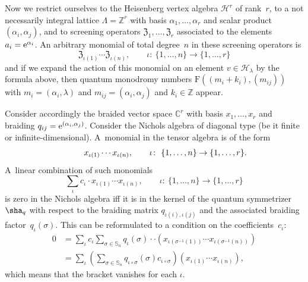 \documentclass[pdftex]{sigma}%
\numberwithin{equation}{section}
\newcommand{\Z}{\mathbb{Z}}
\newcommand{\C}{\mathbb{C}}
\renewcommand{\S}{\mathbb{S}}
\newcommand{\zem}{\mathfrak{Z}}
\newcommand{\Fp}{\mathrm{F}}
\begin{document}
Now we restrict ourselves to the Heisenberg vertex algebra $\mathcal{H}^r$ of rank~$r$, to a not necessarily integral lattice $\Lambda=\Z^r$ with basis $\alpha_1,\dots, \alpha_r$ and scalar product $(\alpha_i,\alpha_j)$, and to screening operators $\zem_1,\dots,\zem_r$ associated to the elements $a_i={\rm e}^{\alpha_i}$.
An arbitrary monomial of total degree~$n$ in these screening operators is
\[ \zem_{\iota(1)}\cdots \zem_{\iota(n)},\qquad \iota\colon \ \{1,\dots,n\}\to \{1,\dots,r\}\]
and if we expand the action of this monomial on an element $v\in \mathcal{H}_\lambda$ by the formula above, then quantum monodromy numbers $\Fp((m_i+k_i),(m_{ij}))$ with $m_i=(\alpha_i,\lambda)$ and $m_{ij}=(\alpha_i,\alpha_j)$ and $k_i\in \Z$ appear.

Consider accordingly the braided vector space $\C^r$ with basis $x_1,\dots, x_r$ and braiding $q_{ij}={\rm e}^{(\alpha_i,\alpha_j)}$.
Consider the Nichols algebra of diagonal type (be it finite or infinite-dimensional). A~monomial in the tensor algebra is of the form
\[\hphantom{\sum_{\iota} c_\iota\cdot }
x_{\iota(1)}\cdots x_{\iota(n)},\qquad \iota\colon \ \{1,\dots,n\}\to \{1,\dots,r\}.\]
A~linear combination of such monomials
\[\sum_{\iota} c_\iota\cdot x_{\iota(1)}\cdots x_{\iota(n)},\qquad \iota\colon \ \{1,\dots,n\}\to \{1,\dots,r\}\]
is zero in the Nichols algebra iff it is in the kernel of the quantum symmetrizer $\sha_q$ with respect to the braiding matrix $q_{\iota(i),\iota(j)}$ and the associated braiding factor~$q_\iota(\sigma)$. This can be reformulated to a condition on the coefficients~$c_\iota$:
\begin{align*}
0&=\sum_{\iota}c_{\iota}\sum_{\sigma\in\S_n} q_{\iota}(\sigma) \cdot \cdot \left(x_{\iota(\sigma^{-1}(1))} \cdots x_{\iota(\sigma^{-1}(n))}\right)\\
&=\sum_{\iota}\left(\sum_{\sigma\in\S_n} q_{\iota\circ\sigma}(\sigma)c_{\iota\circ\sigma} \right) \left(x_{\iota(1)} \cdots x_{\iota(n)}\right),
\end{align*}
which means that the bracket vanishes for each $\iota$.
\end{document}
